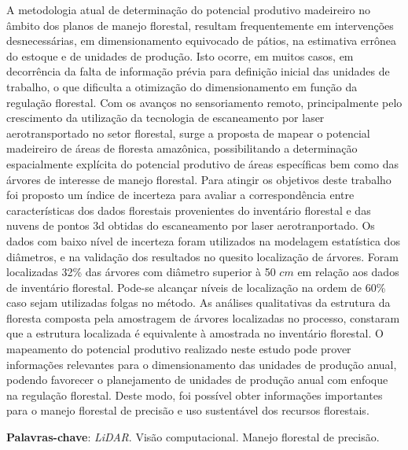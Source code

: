 \documentclass[
	12pt,				%
	openright,			%
	twoside,			%
	a4paper,			%
	chapter=TITLE,		%
	sumario=abnt-6027-2012,
	english,			%
	brazil				%
	]{UFVJM-abntex2}
\begin{document}
\begin{resumo}[RESUMO]
\noindent 
A metodologia atual de determinação do potencial produtivo madeireiro no âmbito dos planos de manejo florestal, resultam frequentemente em intervenções desnecessárias, em dimensionamento equivocado de pátios, na estimativa errônea do estoque e de unidades de produção. Isto ocorre, em muitos casos, em decorrência da falta de informação prévia para definição inicial das unidades de trabalho, o que dificulta a otimização do dimensionamento em função da regulação florestal. 
Com os avanços no sensoriamento remoto, principalmente pelo crescimento da utilização da tecnologia de escaneamento por laser aerotransportado no setor florestal, surge a proposta de mapear o potencial madeireiro de áreas de floresta amazônica, possibilitando a determinação espacialmente explícita do potencial produtivo de áreas específicas bem como das árvores de interesse de manejo florestal.
Para atingir os objetivos deste trabalho foi proposto um índice de incerteza para avaliar a correspondência entre características dos dados florestais provenientes do inventário florestal e das nuvens de pontos 3d obtidas do escaneamento por laser aerotranportado. 
Os dados com baixo nível de incerteza foram utilizados na modelagem estatística dos diâmetros, e na validação dos resultados no quesito localização de árvores. 
Foram localizadas 32\% das árvores com diâmetro superior à 50 $cm$ em relação aos dados de inventário florestal. Pode-se alcançar níveis de localização na ordem de 60\% caso sejam utilizadas folgas no método. 
As análises qualitativas da estrutura da floresta composta pela amostragem de árvores localizadas no processo, constaram que a estrutura localizada é equivalente à amostrada no inventário florestal.  O mapeamento do potencial produtivo realizado neste estudo pode prover informações relevantes para o dimensionamento das unidades de produção anual, podendo favorecer o planejamento de unidades de produção anual com enfoque na regulação florestal. Deste modo, foi possível obter informações importantes para o manejo florestal de precisão e uso sustentável dos recursos florestais.

\vspace{\onelineskip}
\noindent \textbf{Palavras-chave}: \textit{LiDAR}. Visão computacional. Manejo florestal de precisão.
\end{resumo}
\end{document}
